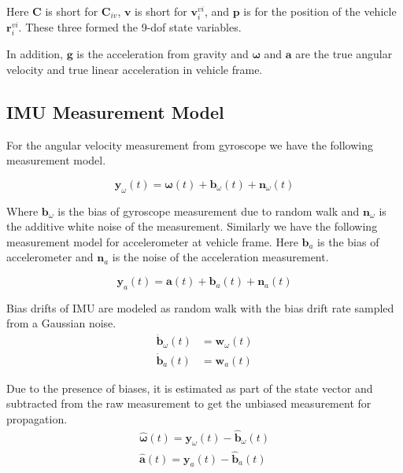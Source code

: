 \documentclass[conference]{IEEEtran}
\begin{document}
Here $\textbf{C}$ is short for $\textbf{C}_{iv}$, $\textbf{v}$ is short for $\textbf{v}_i^{vi}$, and $\textbf{p}$ is for the position of the vehicle $\textbf{r}_i^{vi}$. These three formed the 9-dof state variables.

In addition, $\textbf{g}$ is the acceleration from gravity and $\bm{\omega}$ and $\textbf{a}$ are the true angular velocity and true linear acceleration in vehicle frame.

\subsection{IMU Measurement Model}

For the angular velocity measurement from gyroscope we have the following measurement model.

\begin{equation}
    \textbf{y}_\omega(t) = \bm{\omega}(t) + \textbf{b}_\omega(t) + \textbf{n}_\omega(t)
\end{equation}

Where $\textbf{b}_\omega$ is the bias of gyroscope measurement due to random walk and $\textbf{n}_\omega$ is the additive white noise of the measurement. Similarly we have the following measurement model for accelerometer at vehicle frame. Here $\textbf{b}_a$ is the bias of accelerometer and $\textbf{n}_a$ is the noise of the acceleration measurement.

\begin{equation}
    \textbf{y}_a(t) = \textbf{a}(t) + \textbf{b}_a(t) + \textbf{n}_a(t)
\end{equation}

Bias drifts of IMU are modeled as random walk with the bias drift rate sampled from a Gaussian noise.
\begin{equation}
\begin{split}
    \dot{\textbf{b}}_\omega(t) &= \textbf{w}_\omega(t) \\
    \dot{\textbf{b}}_a(t) &= \textbf{w}_a(t)
\end{split}
\end{equation}

Due to the presence of biases, it is estimated as part of the state vector and subtracted from the raw measurement to get the unbiased measurement for propagation.
\begin{equation}
\begin{split}
    \hat{\bm{\omega}}(t) = \textbf{y}_\omega(t) - \hat{\textbf{b}}_\omega(t) \\
    \hat{\textbf{a}}(t)  = \textbf{y}_a(t) - \hat{\textbf{b}}_a(t)
\end{split}
\end{equation}
\end{document}
